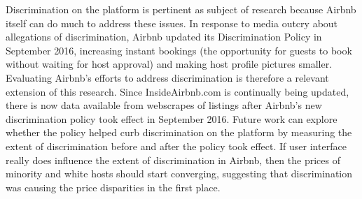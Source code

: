 Discrimination on the platform is pertinent as subject of research because Airbnb itself can do much to address these issues. 
In response to media outcry about allegations of discrimination, Airbnb updated its Discrimination Policy in September 2016, increasing instant bookings (the opportunity for guests to book without waiting for host approval) and making host profile pictures smaller. Evaluating Airbnb's efforts to address discrimination is therefore a relevant extension of this research. Since InsideAirbnb.com is continually being updated, there is now data available from webscrapes of listings after Airbnb's new discrimination policy took effect in September 2016. Future work can explore whether the policy helped curb discrimination on the platform by measuring the extent of discrimination before and after the policy took effect. If user interface really does influence the extent of discrimination in Airbnb, then the prices of minority and white hosts should start converging, suggesting that discrimination was causing the price disparities in the first place. 

